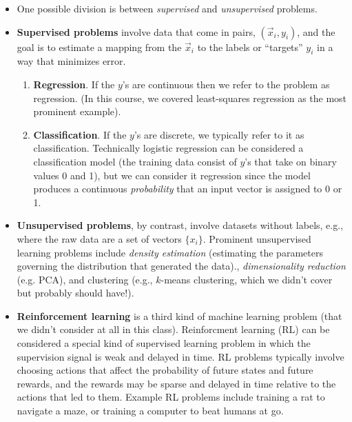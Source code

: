 \documentclass[11pt]{article}
\begin{document}
\begin{itemize}


\item One possible division is between {\it supervised} and {\it
  unsupervised} problems.  

\item {\bf Supervised problems} involve data that come in pairs,
  $(\vec x_i, y_i)$, and the goal is to estimate a mapping from the
  $\vec x_i$ to the labels or ``targets'' $y_i$ in a way that
  minimizes error.  
\begin{enumerate}
\item {\bf Regression}. If the $y$'s are continuous then we refer to the problem as
  regression.  (In this course, we covered least-squares regression as
  the most prominent example).
\item {\bf Classification}. If the $y$'s are discrete, we typically
  refer to it as classification.  Technically logistic regression can
  be considered a classification model (the training data consist of
  $y$'s that take on binary values 0 and 1), but we can consider it
  regression since the model produces a continuous {\it probability}
  that an input vector is assigned to 0 or 1. 
\end{enumerate}

\item {\bf Unsupervised problems}, by contrast, involve datasets
  without labels, e.g., where the raw data are a set of vectors
  $\{x_i\}$.  Prominent unsupervised learning problems include {\it density
  estimation} (estimating the parameters governing the distribution
  that generated the data)., {\it dimensionality reduction} (e.g. PCA), and clustering
  (e.g., $k$-means clustering, which we didn't cover but probably
  should have!). 

\item {\bf Reinforcement learning} is a third kind of machine learning
  problem (that we didn't consider at all in this class).
  Reinforcment learning (RL) can be considered a special kind of
  supervised learning problem in which the supervision signal is weak
  and delayed in time.  RL problems typically involve choosing actions
  that affect the probability of future states and future rewards, and
  the rewards may be sparse and delayed in time relative to the
  actions that led to them.  Example RL problems include training a
  rat to navigate a maze, or training a computer to beat humans at go.

\end{itemize}
\end{document}
